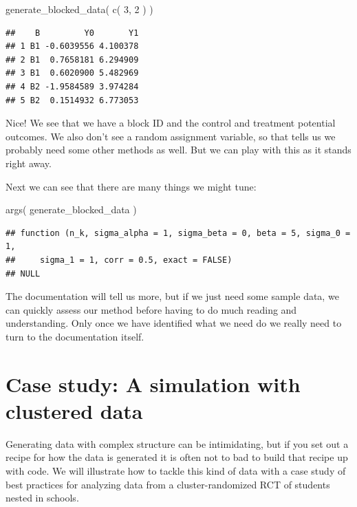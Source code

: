 \documentclass[
]{book}
\newenvironment{Shaded}{\begin{snugshade}}{\end{snugshade}}
\newcommand{\DecValTok}[1]{\textcolor[rgb]{0.00,0.00,0.81}{#1}}
\newcommand{\FunctionTok}[1]{\textcolor[rgb]{0.00,0.00,0.00}{#1}}
\newcommand{\NormalTok}[1]{#1}
\begin{document}
\begin{Shaded}
\begin{Highlighting}[]
\FunctionTok{generate\_blocked\_data}\NormalTok{( }\FunctionTok{c}\NormalTok{( }\DecValTok{3}\NormalTok{, }\DecValTok{2}\NormalTok{ ) )}
\end{Highlighting}
\end{Shaded}

\begin{verbatim}
##    B         Y0       Y1
## 1 B1 -0.6039556 4.100378
## 2 B1  0.7658181 6.294909
## 3 B1  0.6020900 5.482969
## 4 B2 -1.9584589 3.974284
## 5 B2  0.1514932 6.773053
\end{verbatim}

Nice! We see that we have a block ID and the control and treatment potential outcomes. We also don't see a random assignment variable, so that tells us we probably need some other methods as well.
But we can play with this as it stands right away.

Next we can see that there are many things we might tune:

\begin{Shaded}
\begin{Highlighting}[]
\FunctionTok{args}\NormalTok{( generate\_blocked\_data )}
\end{Highlighting}
\end{Shaded}

\begin{verbatim}
## function (n_k, sigma_alpha = 1, sigma_beta = 0, beta = 5, sigma_0 = 1, 
##     sigma_1 = 1, corr = 0.5, exact = FALSE) 
## NULL
\end{verbatim}

The documentation will tell us more, but if we just need some sample data, we can quickly assess our method before having to do much reading and understanding.
Only once we have identified what we need do we really need to turn to the documentation itself.

\hypertarget{case_cluster}{%
\chapter{Case study: A simulation with clustered data}\label{case_cluster}}

Generating data with complex structure can be intimidating, but if you set out a recipe for how the data is generated it is often not to bad to build that recipe up with code.
We will illustrate how to tackle this kind of data with a case study of best practices for analyzing data from a cluster-randomized RCT of students nested in schools.
\end{document}
